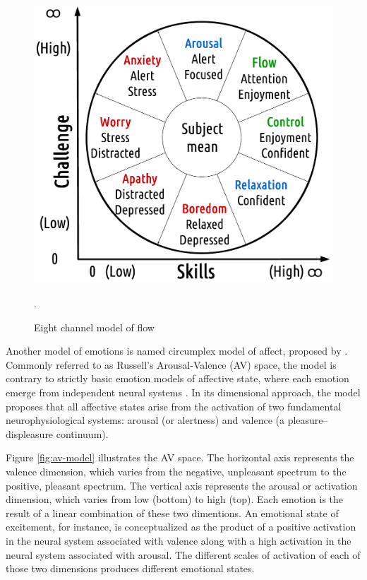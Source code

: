 \begin{figure}[h!]
    \centering
    \includegraphics[scale=0.4]{figures/flow-eight.png}
    \caption{Eight channel model of flow \parencite{nakamura2014concept}}.
    \label{fig:flow-eight}
\end{figure}

Another model of emotions is named circumplex model of affect, proposed by \textcite{russell1978evidence}. Commonly referred to as Russell's Arousal-Valence (AV) space, the model is contrary to strictly basic emotion models of affective state, where each emotion emerge from independent neural systems \parencite{posner2005circumplex}. In its dimensional approach, the model proposes that all affective states arise from the activation of two fundamental neurophysiological systems: arousal (or alertness) and valence (a pleasure–displeasure continuum).

Figure \ref{fig:av-model} illustrates the AV space. The horizontal axis represents the valence dimension, which varies from the negative, unpleasant spectrum to the positive, pleasant spectrum. The vertical axis represents the arousal or activation dimension, which varies from low (bottom) to high (top). Each emotion is the result of a linear combination of these two dimentions. An emotional state of excitement, for instance, is conceptualized as the product of a positive activation in the neural system associated with valence along with a high activation in the neural system associated with arousal. The different scales of activation of each of those two dimensions produces different emotional states.

